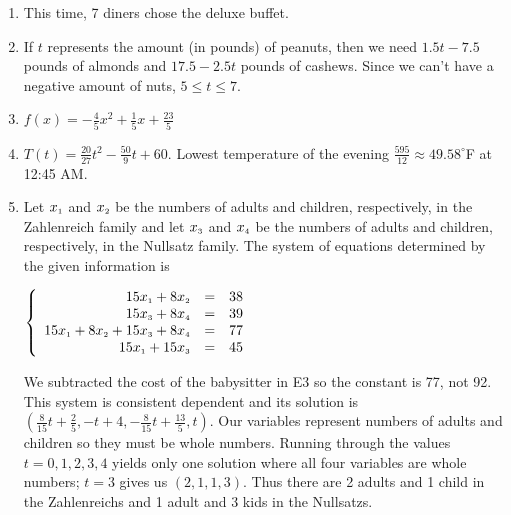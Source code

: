\begin{enumerate}
\setcounter{enumi}{\value{HW}}

\item  This time, 7 diners chose the deluxe buffet.

\item  If $t$ represents the amount (in pounds) of peanuts, then we need $1.5 t - 7.5$ pounds of almonds and $17.5 - 2.5t$ pounds of cashews.  Since we can't have a negative amount of nuts, $5 \leq t \leq 7$. 

\item  $f(x) = -\frac{4}{5} x^2+\frac{1}{5} x + \frac{23}{5}$

\item  $T(t) = \frac{20}{27} t^2 - \frac{50}{9} t + 60$.  Lowest temperature of the evening $\frac{595}{12} \approx 49.58^{\circ}$F at 12:45 AM.

\newpage

\item Let $x_{\mbox{\tiny$1$}}$ and $x_{\mbox{\tiny$2$}}$ be the numbers of adults and children, respectively, in the Zahlenreich family and let $x_{\mbox{\tiny$3$}}$ and $x_{\mbox{\tiny$4$}}$ be the numbers of adults and children, respectively, in the Nullsatz family.  The system of equations determined by the given information is 

$\left\{ \begin{array}{rcr} 15x_{\mbox{\tiny$1$}} + 8x_{\mbox{\tiny$2$}} & = & 38 \\ 
15x_{\mbox{\tiny$3$}} + 8x_{\mbox{\tiny$4$}} & = & 39  \\  
15x_{\mbox{\tiny$1$}} +  8x_{\mbox{\tiny$2$}} + 15x_{\mbox{\tiny$3$}} + 8x_{\mbox{\tiny$4$}} & = & 77 \\
15x_{\mbox{\tiny$1$}} + 15x_{\mbox{\tiny$3$}} & = & 45  \end{array} \right.$

We subtracted the cost of the babysitter in E3 so the constant is 77, not 92.  This system is consistent dependent and its solution is $\left(\frac{8}{15}t + \frac{2}{5}, -t + 4, -\frac{8}{15}t + \frac{13}{5}, t \right)$.  Our variables represent numbers of adults and children so they must be whole numbers.  Running through the values $t = 0, 1, 2, 3, 4$ yields only one solution where all four variables are whole numbers; $t = 3$ gives us $(2, 1, 1, 3)$.  Thus there are 2 adults and 1 child in the Zahlenreichs and 1 adult and 3 kids in the Nullsatzs.


\end{enumerate}

\closegraphsfile